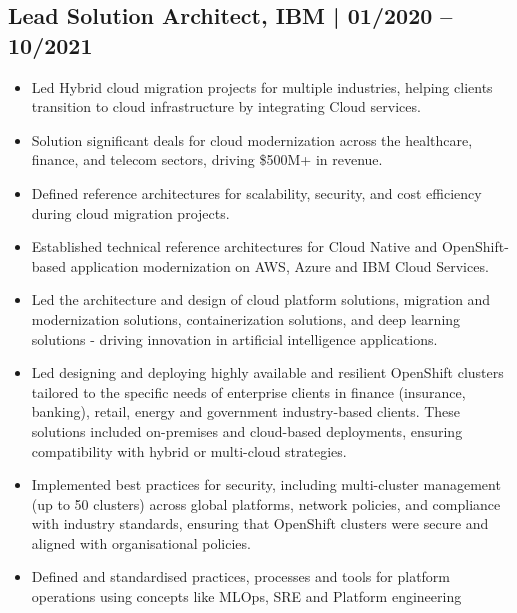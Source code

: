 \documentclass[12pt,parskip=half]{scrartcl}
\begin{document}
\subsection*{Lead Solution Architect, IBM | 01/2020 -- 10/2021}
\begin{itemize}
    \item Led Hybrid cloud migration projects for multiple industries, helping clients transition to cloud infrastructure by integrating Cloud services.
    \item Solution significant deals for cloud modernization across the healthcare, finance, and telecom sectors, driving \$500M+ in revenue.
    \item Defined reference architectures for scalability, security, and cost efficiency during cloud migration projects.
    \item Established technical reference architectures for Cloud Native and OpenShift-based application modernization on AWS, Azure and IBM Cloud Services.
    \item Led the architecture and design of cloud platform solutions, migration and modernization solutions, containerization solutions, and deep learning solutions - driving innovation in artificial intelligence applications.
    
   \item Led designing and deploying highly available and resilient OpenShift clusters tailored to the specific needs of enterprise clients in finance (insurance, banking), retail, energy and government industry-based clients. These solutions included on-premises and cloud-based deployments, ensuring compatibility with hybrid or multi-cloud strategies.
   \item Implemented best practices for security, including multi-cluster management (up to 50 clusters) across global platforms, network policies, and compliance with industry standards, ensuring that OpenShift clusters were secure and aligned with organisational policies.
   \item Defined and standardised practices, processes and tools for platform operations using concepts like MLOps, SRE and Platform engineering
\end{itemize}
\end{document}
